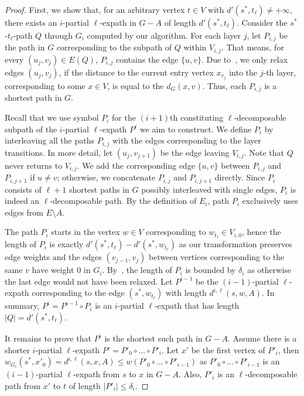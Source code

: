 \documentclass{article}\usepackage[a4paper,margin=20mm]{geometry}
\newcommand*{\length}[1]{|#1|}
\renewcommand{\le}{\leqslant}
\begin{document}
\begin{proof}
First, we show that, for an arbitrary vertex $t \in V$ with $d'(s^*,t_\ell) \neq +\infty$,
there exists an $i$-partial $\ell$-expath in $G-A$ of length $d'(s^*,t_\ell)$.
Consider the $s^*$-$t_\ell$-path $Q$ through $G_i$ computed by our algorithm.
For each layer $j$, let $P_{i,j}$ be the path in $G$ corresponding 
to the subpath of $Q$ within $V_{i,j}$. 
That means, for every $(u_j, v_j) \in E(Q)$, $P_{i,j}$ contains the edge $\{u, v\}$.
Due to~, we only relax edges $(u_j, v_j)$,
if the distance to the current entry vertex $x_{v_j}$ into the $j$-th layer,
corresponding to some $x \in V$, is equal to the $d_G(x,v)$.
Thus, each $P_{i,j}$ is a shortest path in $G$.

Recall that we use symbol $P_i$ for the $(i{+}1)$th constituting $\ell$-de\-com\-pos\-able subpath of 
the $i$-partial $\ell$-expath $P^{i}$ we aim to construct. 
We define $P_i$ by interleaving all the paths $P_{i,j}$ 
with the edges corresponding to the layer transitions. 
In more detail, let $(u_j,v_{j+1})$ be the edge leaving $V_{i,j}$.
Note that $Q$ never returns to $V_{i,j}$.
We add the corresponding edge $\{u,v\}$ between $P_{i,j}$ and $P_{i,j+1}$ if $u \neq v$;
otherwise, we concatenate $P_{i,j}$ and $P_{i,j+1}$ directly.
Since $P_i$ consists of $\ell+1$ shortest paths in $G$ possibly interleaved with single edges,
$P_i$ is indeed an $\ell$-decomposable path.
By the definition of $E_i$, path $P_i$ exclusively uses edges from $E{\setminus}A$.

The path $P_i$ starts in the vertex $w \in V$ corresponding to $w_{t_\ell} \in V_{i,0}$, 
hence the length of $P_i$ is exactly $d'(s^*, t_\ell) - d'(s^*, w_{t_\ell})$
as our transformation preserves edge weights
and the edges $(v_{j-1},v_j)$ between vertices corresponding to the same $v$ have weight $0$ in $G_i$. 
By~, the length of $P_i$ is bounded by $\delta_i$
as otherwise the last edge would not have been relaxed.
Let $P^{i-1}$ be the $(i{-}1)$-partial $\ell$-expath corresponding to the edge $(s^*, w_{t_\ell})$
with length $d^{i,\ell}(s,w,A)$.
In summary, $P^{i} = P^{i-1} \circ P_i$ is an $i$-partial $\ell$-expath
that has length $\length{Q} = d'(s^*, t_\ell)$.

It remains to prove that $P^{i}$ is the shortest such path in $G - A$.
Assume there is a shorter $i$-partial $\ell$-expath $P' = P'_0 \circ \ldots \circ P'_i$.
Let $x'$ be the first vertex of $P'_i$, then $w_{G_i}(s^*, x'_0) = d^{i,\ell}(s,x,A) \le w( P'_0 \circ \ldots \circ P'_{i-1})$ as $P'_0 \circ \ldots \circ P'_{i-1}$ is an $(i{-}1)$-partial $\ell$-expath
from $s$ to $x$ in $G-A$.
Also, $P'_i$ is an $\ell$-decomposable path from $x'$ to $t$ of length $\length{P'_i} \le \delta_i$.


\end{proof}
\end{document}

